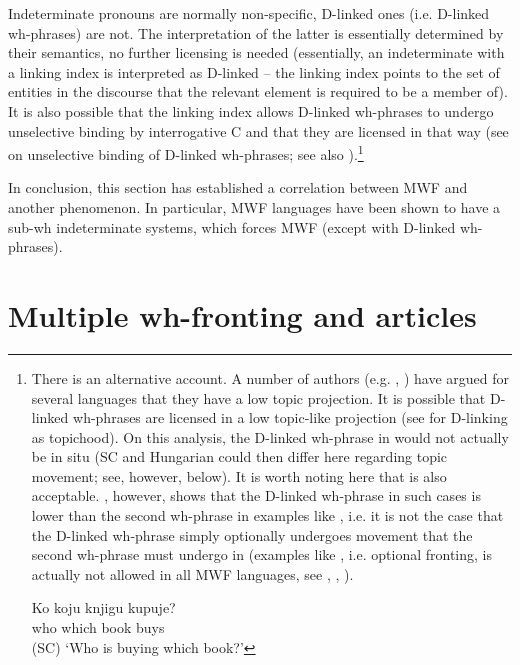\documentclass[output=paper,colorlinks,citecolor=brown]{langscibook}
\begin{document}

Indeterminate pronouns are normally non-specific, D-linked ones (i.e. D-linked wh-phrases) are not. The interpretation of the latter is essentially determined by their semantics, no further licensing is needed (essentially, an indeterminate with a linking index is interpreted as D-linked -- the linking index points to the set of entities in the discourse that the relevant element is required to be a member of). It is also possible that the linking index allows D-linked wh-phrases to undergo unselective binding by interrogative C and that they are licensed in that way (see \citealt{Pesetsky1987} on unselective binding of D-linked wh-phrases; see also ).\footnote{There is an alternative account. A number of authors (e.g. \citealt{bos:Belletti2004}, \citealt{Lacerda2020}) have argued for several languages that they have a low topic projection. It is possible that D-linked wh-phrases are licensed in a low topic-like projection (see \citealt{Grohmann2006} for D-linking as topichood). On this analysis, the D-linked wh-phrase in  would not actually be in situ (SC and Hungarian could then differ here regarding topic movement; see, however, below). It is worth noting here that  is also acceptable. \citet{Bošković2002}, however, shows that the D-linked wh-phrase in such cases is lower than the second wh-phrase in examples like , i.e. it is not the case that the D-linked wh-phrase simply optionally undergoes movement that the second wh-phrase must undergo in  (examples like , i.e. optional fronting, is actually not allowed in all MWF languages, see \citealt{Bošković2002}, \citealt{Pesetsky1987}, \citealt{Wachowicz1974}).

\ea \label{ex:bosk:fnSC}
\gll Ko    koju   knjigu kupuje?\\     
who which book   buys\\ \hfill          (SC)
\glt `Who is buying which book?'
\z

}

\largerpage
In conclusion, this section has established a correlation between MWF and another phenomenon. In particular, MWF languages have been shown to have a sub-wh indeterminate systems, which forces MWF (except with D-linked wh-phrases).

\section{Multiple wh-fronting and articles}\label{sec:bosk:2}
\end{document}
